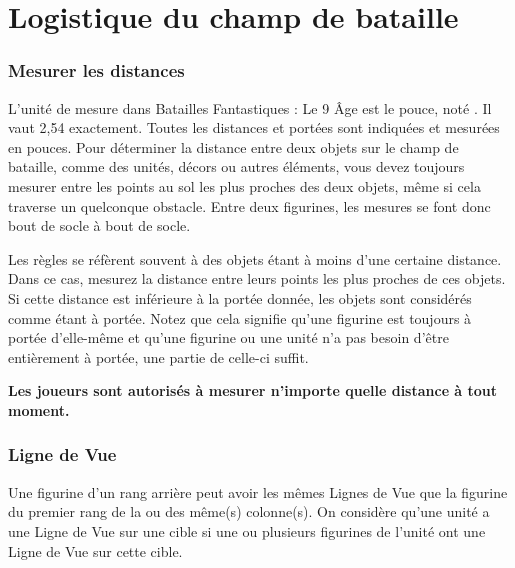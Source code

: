 
\part{Logistique du champ de bataille}

\hypertarget{measuringdistances}{\section{Mesurer les distances}}

L'unité de mesure dans Batailles Fantastiques : Le 9\ieme{} Âge est le pouce, noté \distance{}. Il vaut 2,54 {\centi\meter} exactement. Toutes les distances et portées sont indiquées et mesurées en pouces. Pour déterminer la distance entre deux objets sur le champ de bataille, comme des unités, décors ou autres éléments, vous devez toujours mesurer entre les points au sol les plus proches des deux objets, même si cela traverse un quelconque obstacle. Entre deux figurines, les mesures se font donc bout de socle à bout de socle.

Les règles se réfèrent souvent à des objets étant à moins d'une certaine distance. Dans ce cas, mesurez la distance entre leurs points les plus proches de ces objets. Si cette distance est inférieure à la portée donnée, les objets sont considérés comme étant à portée. Notez que cela signifie qu'une figurine est toujours à portée d'elle-même et qu'une figurine ou une unité n'a pas besoin d'être entièrement à portée, une partie de celle-ci suffit.
 
\textbf{Les joueurs sont autorisés à mesurer n'importe quelle distance à tout moment.}

\hypertarget{lineofsight}{\section{Ligne de Vue}}

 Une figurine d'un rang arrière peut avoir les mêmes Lignes de Vue que la figurine du premier rang de la ou des même(s) colonne(s). On considère qu'une unité a une Ligne de Vue sur une cible si une ou plusieurs figurines de l'unité ont une Ligne de Vue sur cette cible. 

